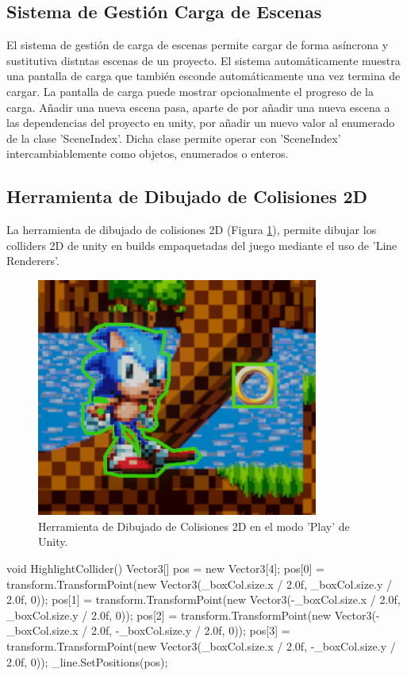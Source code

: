 \subsection{Sistema de Gestión Carga de Escenas}
El sistema de gestión de carga de escenas permite cargar de forma asíncrona y sustitutiva distntas escenas de un proyecto. El sistema automáticamente muestra una 
pantalla de carga que también esconde automáticamente una vez termina de cargar. La pantalla de carga puede mostrar opcionalmente el progreso de la carga. Añadir una nueva
 escena pasa, aparte de por añadir una nueva escena a las dependencias del proyecto en unity, por añadir un nuevo valor al enumerado de la clase 'SceneIndex'. Dicha clase 
 permite operar con 'SceneIndex' intercambiablemente como objetos, enumerados o enteros.

\subsection{Herramienta de Dibujado de Colisiones 2D}
La herramienta de dibujado de colisiones 2D (Figura \ref{fig:debug2d}), permite dibujar los colliders 2D de unity en builds empaquetadas del juego mediante el uso de
 'Line Renderers'. 

\begin{figure}[H]
  \centering
    \includegraphics[width=350px,clip=true]{debug2d.png}
  \caption{Herramienta de Dibujado de Colisiones 2D en el modo 'Play' de Unity.}
  \label{fig:debug2d}
\end{figure}

\begin{mypython}[caption={Algoritmo para pintar un box collider 2D.},label={alg:debugbox2d}]
    void HighlightCollider()
    {
        Vector3[] pos = new Vector3[4];
        pos[0] = transform.TransformPoint(new Vector3(_boxCol.size.x / 2.0f, _boxCol.size.y / 2.0f, 0));
        pos[1] = transform.TransformPoint(new Vector3(-_boxCol.size.x / 2.0f, _boxCol.size.y / 2.0f, 0));
        pos[2] = transform.TransformPoint(new Vector3(-_boxCol.size.x / 2.0f, -_boxCol.size.y / 2.0f, 0));
        pos[3] = transform.TransformPoint(new Vector3(_boxCol.size.x / 2.0f, -_boxCol.size.y / 2.0f, 0));
        _line.SetPositions(pos);
    }
\end{mypython}

